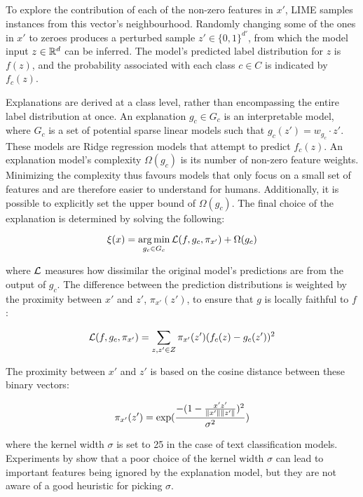 To explore the contribution of each of the non-zero features in $x'$, LIME samples instances from this vector's neighbourhood.
Randomly changing some of the ones in $x'$ to zeroes produces a perturbed sample $z' \in \{0,1\}^{d'}$, from which the model input $z \in \mathbb{R}^d$ can be inferred.
The model's predicted label distribution for $z$ is $f(z)$,
and the probability associated with each class $c \in C$ is indicated by $f_c(z)$. 

Explanations are derived at a class level, rather than encompassing the entire label distribution at once.
An explanation $g_c \in G_c$ is an interpretable model, where $G_c$ is a set of potential sparse linear models such that $g_c(z') = w_{g_c} \cdot z'$.
These models are Ridge regression models that attempt to predict $f_c(z)$.
An explanation model's complexity $\Omega(g_c)$ is its number of non-zero feature weights.
Minimizing the complexity thus favours models that only focus on a small set of features and are therefore easier to understand for humans.
Additionally, it is possible to explicitly set the upper bound of $\Omega(g_c)$.
The final choice of the explanation is determined by solving the following:

\begin{equation}
\label{eq:optimize-expl}
    \xi(x) = \operatorname*{arg\,min}_{g_c \in G_c} \mathcal{L}(f, g_c, \pi_{x'}) + \Omega(g_c)
\end{equation}

where $\mathcal{L}$ measures how dissimilar the original model's predictions are from the output of $g_c$.
The difference between the prediction distributions is weighted by the proximity between $x'$ and $z'$, $\pi_{x'}(z')$, to ensure that $g$ is locally faithful to $f$:

\begin{equation}
    \mathcal{L}(f,g_c,\pi_{x'}) = \sum_{z,z' \in Z} \pi_{x'}(z') (f_c(z) - g_c(z'))^2
\end{equation}

The proximity between $x'$ and $z'$ is based on the cosine distance between these binary vectors:

\begin{equation}
    \pi_{x'}(z') = \text{exp}(\frac{-(1 - \frac{x'z'}{\lVert x'\rVert\lVert z'\rVert})^2}{\sigma^2})
\end{equation}

where the kernel width $\sigma$ is set to 25 in the case of text classification models.
Experiments by \citet{garreau2020explaining} show that a poor choice of the kernel width $\sigma$ can lead to important features being ignored by the explanation model, but they are not aware of a good heuristic for picking $\sigma$.

